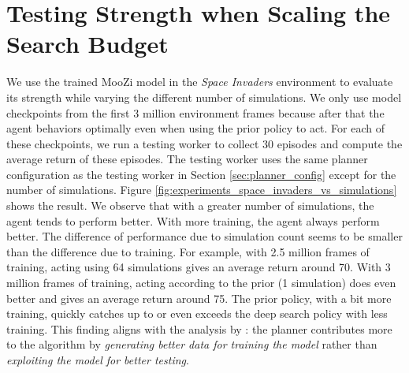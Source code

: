 \section{Testing Strength when Scaling the Search Budget}
We use the trained MooZi model in the \textit{Space Invaders} environment to evaluate its strength while varying the different number of simulations.
We only use model checkpoints from the first 3 million environment frames because after that the agent behaviors optimally even when using the prior policy to act.
For each of these checkpoints, we run a testing worker to collect 30 episodes and compute the average return of these episodes.
The testing worker uses the same planner configuration as the testing worker in Section \ref{sec:planner_config} except for the number of simulations.
Figure \ref{fig:experiments_space_invaders_vs_simulations} shows the result.
We observe that with a greater number of simulations, the agent tends to perform better.
With more training, the agent always perform better.
The difference of performance due to simulation count seems to be smaller than the difference due to training.
For example, with 2.5 million frames of training, acting using 64 simulations gives an average return around 70.
With 3 million frames of training, acting according to the prior (1 simulation) does even better and gives an average return around 75.
The prior policy, with a bit more training, quickly catches up to or even exceeds the deep search policy with less training.
This finding aligns with the analysis by \citeauthor{ROLEPLANNINGMODELBASED_Hamrick.Friesen.ea_2021} \cite{ROLEPLANNINGMODELBASED_Hamrick.Friesen.ea_2021}:
the planner contributes more to the algorithm by \textit{generating better data for training the model} rather than \textit{exploiting the model for better testing}.


